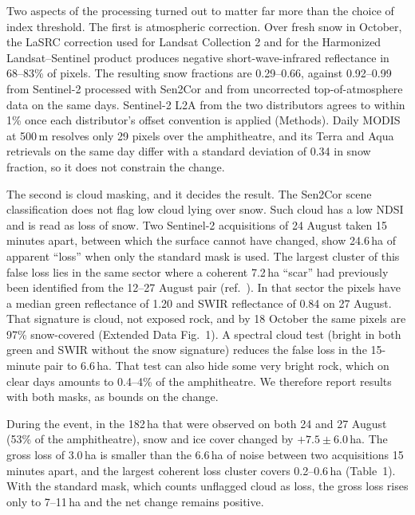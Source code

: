 \documentclass{nature}
\begin{document}
Two aspects of the processing turned out to matter far more than the choice of index threshold. The first is atmospheric correction. Over fresh snow in October, the LaSRC correction used for Landsat Collection 2 and for the Harmonized Landsat--Sentinel product\cite{vermote2016,claverie2018} produces negative short-wave-infrared reflectance in 68--83\% of pixels. The resulting snow fractions are 0.29--0.66, against 0.92--0.99 from Sentinel-2 processed with Sen2Cor\cite{mainknorn2017} and from uncorrected top-of-atmosphere data on the same days. Sentinel-2 L2A from the two distributors agrees to within 1\% once each distributor's offset convention is applied (Methods). Daily MODIS at 500\,m resolves only 29 pixels over the amphitheatre, and its Terra and Aqua retrievals on the same day differ with a standard deviation of 0.34 in snow fraction, so it does not constrain the change.

The second is cloud masking, and it decides the result. The Sen2Cor scene classification does not flag low cloud lying over snow. Such cloud has a low NDSI and is read as loss of snow. Two Sentinel-2 acquisitions of 24 August taken 15 minutes apart, between which the surface cannot have changed, show 24.6\,ha of apparent ``loss'' when only the standard mask is used. The largest cluster of this false loss lies in the same sector where a coherent 7.2\,ha ``scar'' had previously been identified from the 12--27 August pair (ref.~). In that sector the pixels have a median green reflectance of 1.20 and SWIR reflectance of 0.84 on 27 August. That signature is cloud, not exposed rock, and by 18 October the same pixels are 97\% snow-covered (Extended Data Fig.~1). A spectral cloud test (bright in both green and SWIR without the snow signature) reduces the false loss in the 15-minute pair to 6.6\,ha. That test can also hide some very bright rock, which on clear days amounts to 0.4--4\% of the amphitheatre. We therefore report results with both masks, as bounds on the change.


During the event, in the 182\,ha that were observed on both 24 and 27 August (53\% of the amphitheatre), snow and ice cover changed by $+7.5\pm6.0$\,ha. The gross loss of 3.0\,ha is smaller than the 6.6\,ha of noise between two acquisitions 15 minutes apart, and the largest coherent loss cluster covers 0.2--0.6\,ha (Table~1). With the standard mask, which counts unflagged cloud as loss, the gross loss rises only to 7--11\,ha and the net change remains positive.
\end{document}
